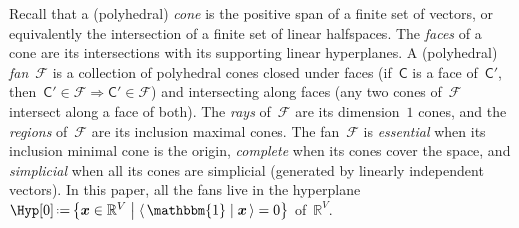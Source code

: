 \documentclass{amsart}
\theoremstyle{definition}
\newcommand{\R}{\mathbb{R}} %
\renewcommand{\c}[1]{{\mathcal{#1}}} %
\renewcommand{\b}[1]{{\boldsymbol{#1}}} %
\newcommand{\bigset}[2]{\big\{ #1 \;\big|\; #2 \big\}} %
\newcommand{\dotprod}[2]{\langle \, #1 \; | \; #2 \, \rangle} %
\newcommand{\one}{\mathbbm{1}} %
\newcommand{\eqdef}{\mbox{\,\raisebox{0.2ex}{\scriptsize\ensuremath{\mathrm:}}\ensuremath{=}\,}} %
\newcommand{\eg}{\textit{e.g.}~} %
\newcommand{\darkblue}{\color{darkblue}} %
\newcommand{\defn}[1]{\textsl{\darkblue #1}} %
\newcommand{\vertexSet}{V}
\newcommand{\polytope}[1]{\mathsf{#1}} %
\begin{document}
%
Recall that a (polyhedral) \defn{cone} is the positive span of a finite set of vectors, or equivalently the intersection of a finite set of linear halfspaces.
The \defn{faces} of a cone are its intersections with its supporting linear hyperplanes.
A (polyhedral) \defn{fan}~$\c{F}$ is a collection of polyhedral cones closed under faces (if~$\polytope{C}$ is a face of~$\polytope{C'}$, then~$\polytope{C'} \in \c{F} \Rightarrow \polytope{C'} \in \c{F}$) and intersecting along faces (any two cones of~$\c{F}$ intersect along a face of both).
The \defn{rays} of~$\c{F}$ are its dimension~$1$ cones, and the \defn{regions} of~$\c{F}$ are its inclusion maximal cones.
The fan~$\c{F}$ is \defn{essential} when its inclusion minimal cone is the origin, \defn{complete} when its cones cover the space, and \defn{simplicial} when all its cones are simplicial (generated by linearly independent vectors).
In this paper, all the fans live in the hyperplane~${\Hyp[0] \eqdef \bigset{\b{x} \in \R^{\vertexSet}}{\dotprod{\one}{\b{x}} = 0}}$ of~$\R^{\vertexSet}$.
\end{document}

